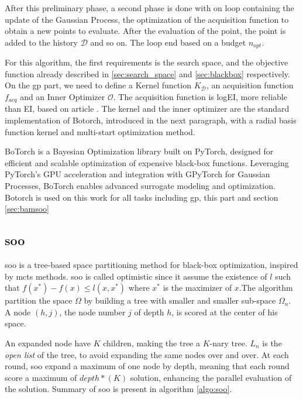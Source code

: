 After this preliminary phase, a second phase is done with on loop containing the update of the Gaussian Process, the optimization of the acquisition function to obtain a new points to evaluate. After the evaluation of the point, the point is added to the history $\mathcal D$ and so on. The loop end based on a budget $n_{opt}$. 

For this algorithm, the first requirements is the search space, and the objective function already described in \ref{sec:search_space} and \ref{sec:blackbox} respectively. On the \acrshort{gp} part, we need to define a Kernel function $K_\mathcal D$, an acquisition function $f_{acq}$ and an Inner Optimizer $\mathcal O$. The acquisition function is logEI, more reliable than EI, based on article \cite{ament_unexpected_2024}. The kernel and the inner optimizer are the standard implementation of Botorch, introduced in the next paragraph, with a radial basis function kernel and multi-start optimization method. 

BoTorch \cite{balandat_botorch_2020} is a Bayesian Optimization library built on PyTorch, designed for efficient and scalable optimization of expensive black-box functions. Leveraging PyTorch's GPU acceleration and integration with GPyTorch \cite{gardner_gpytorch_2021} for Gaussian Processes, BoTorch enables advanced surrogate modeling and optimization. Botorch is used on this work for all tasks including \acrshort{gp}, this part and section \ref{sec:bamsoo}


\subsection{\acrfull{soo}}
\label{sec:soo}

\acrshort{soo} \cite{munos_optimistic_2011} is a tree-based space partitioning method for black-box optimization, inspired by \acrfull{mcts} methods. \acrshort{soo} is called optimistic since it assume the existence of $ l$ such that $f(x^*)-f(x) \leq l(x,x^*)$ where $x^*$ is the maximizer of $x$.The algorithm partition the space $\Omega$ by building a tree with smaller and smaller sub-space $\Omega_n$. A node $(h,j)$, the node number $j$ of depth $h$, is scored at the center of his space. 
    
An expanded node have $K$ children, making the tree a $K$-nary tree. $L_n$ is the \textit{open list} of the tree, to avoid expanding the same nodes over and over. At each round, \acrshort{soo} expand a maximum of one node by depth, meaning that each round score a maximum of $depth*(K)$ solution, enhancing the parallel evaluation of the solution. Summary of \acrshort{soo} is present in algorithm \ref{algo:soo}.

